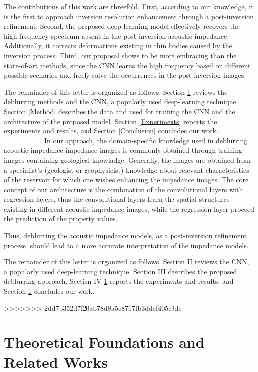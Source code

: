 \documentclass[journal]{IEEEtran}
\begin{document}
The contributions of this work are threefold. First,
according to our knowledge, it is the first to approach
inversion resolution enhancement through a post-inversion
refinement. Second, the proposed deep learning model
effectively recovers the high frequency spectrum absent
in the post-inversion acoustic impedance. Additionally, it
corrects deformations existing in thin bodies caused
by the inversion process. Third, our proposal
shows to be more embracing than the state-of-art
methods, since the CNN learns the high frequency
based on different possible scenarios and freely solve
the occurrences in the post-inversion images.

The remainder of this letter is organized as follows.
Section \ref{Theoretics} reviews the deblurring methods
and the CNN, a popularly used deep-learning technique.
Section \ref{Method} describes the data and used for
training the CNN and the architecture of the proposed model.
Section \ref{Experiments} reports the experiments and
results, and Section \ref{Conclusion} concludes our work.
=======
In our approach, the domain-specific knowledge used in deblurring acoustic impedance impedance images is commonly
obtained through training images containing geological knowladge. Generally, the images are obtained from a specialist's
(geologist or geophysicist) knowledge about relevant characteristics of the reservoir for which one wishes enhancing the impedance images.
The core concept of our architecture is the combination of the convolutional layers with regression layers, thus the convolutional layers learn the spatial structures existing in different acoustic impedance images, while the regression layer proceed the prediction of the property values.

Thus, deblurring the acoustic impedance models, as a post-inversion refinement process, should lead to a more accurate
interpretation of the impedance models.

The remainder of this letter is organized as follows. Section II
reviews the CNN, a popularly used deep-learning technique.
Section III describes the proposed deblurring approach.
Section IV \ref{Theoretics} reports the experiments and results, and Section \ref{Theoretics}
concludes our work.



>>>>>>> 2dd7b352d7f20ab78d8a5c8717fb3ddef405c9dc

\section{Theoretical Foundations and Related Works}\label{Theoretics}
\end{document}
